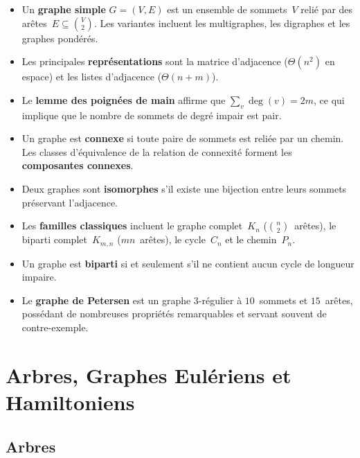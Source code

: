 \documentclass[12pt,a4paper,openany]{book}
\theoremstyle{definition}
\theoremstyle{plain}
\theoremstyle{remark}
\begin{document}
\begin{itemize}
  \item Un \textbf{graphe simple} $G = (V, E)$ est un ensemble de sommets~$V$
    relié par des arêtes~$E \subseteq \binom{V}{2}$. Les variantes incluent les
    multigraphes, les digraphes et les graphes pondérés.
  \item Les principales \textbf{représentations} sont la matrice d'adjacence
    ($\Theta(n^2)$ en espace) et les listes d'adjacence ($\Theta(n+m)$).
  \item Le \textbf{lemme des poignées de main} affirme que
    $\sum_{v} \deg(v) = 2m$, ce qui implique que le nombre de sommets de degré
    impair est pair.
  \item Un graphe est \textbf{connexe} si toute paire de sommets est reliée
    par un chemin. Les classes d'équivalence de la relation de connexité
    forment les \textbf{composantes connexes}.
  \item Deux graphes sont \textbf{isomorphes} s'il existe une bijection entre
    leurs sommets préservant l'adjacence.
  \item Les \textbf{familles classiques} incluent le graphe complet~$K_n$
    ($\binom{n}{2}$~arêtes), le biparti complet~$K_{m,n}$ ($mn$~arêtes),
    le cycle~$C_n$ et le chemin~$P_n$.
  \item Un graphe est \textbf{biparti} si et seulement s'il ne contient aucun
    cycle de longueur impaire.
  \item Le \textbf{graphe de Petersen} est un graphe $3$-régulier à
    $10$~sommets et $15$~arêtes, possédant de nombreuses propriétés
    remarquables et servant souvent de contre-exemple.
\end{itemize}


\chapter{Arbres, Graphes Eulériens et Hamiltoniens}
\label{ch:arbres-euler-hamilton}

\section{Arbres}
\label{sec:arbres}
\end{document}
